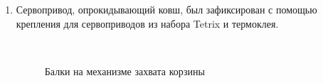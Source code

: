 \begin{enumerate}
\begin{enumerate}
		\item Сервопривод, опрокидывающий ковш, был зафиксирован с помощью крепления для сервоприводов из набора Tetrix и термоклея.
	    \begin{figure}[H]
			\begin{minipage}[h]{0.47\linewidth}
				\caption{Балки на механизме захвата корзины}  
			\end{minipage}
			\hfill
			\begin{minipage}[h]{0.47\linewidth}

\end{minipage}
\end{figure}
\end{enumerate}
\end{enumerate}
